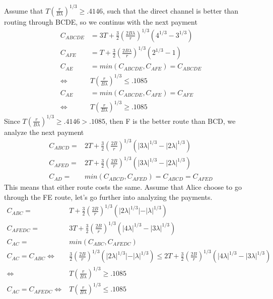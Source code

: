 \documentclass[12pt]{article}
\theoremstyle{plain}
\theoremstyle{remark}
\theoremstyle{definition}
\renewcommand{\geq}{\geqslant}
\renewcommand{\leq}{\leqslant}
\renewcommand{\geq}{\geqslant}
\renewcommand{\leq}{\leqslant}
\begin{document}
Assume that $T(\frac{r}{B\lambda})^{1/3} \geq .4146$, such that the direct channel is better than routing through BCDE, so we continus with the next payment
\begin{align}
  C_{ABCDE} &= 3T+ \frac{3}{2}(\frac{2B\lambda}{r})^{1/3}(4^{1/3}-3^{1/3})\\
  C_{AFE} &= T+ \frac{3}{2}(\frac{2B\lambda}{r})^{1/3}(2^{1/3}-1)\\
  C_{AE} &= min(C_{ABCDE},C_{AFE}) = C_{ABCDE} 
  \\ \iff & T (\frac{r}{B\lambda})^{1/3} \leq .1085\\
  C_{AE} &= min(C_{ABCDE},C_{AFE}) = C_{AFE} \\
  \iff & T (\frac{r}{B\lambda})^{1/3} \geq .1085
\end{align}
Since $T(\frac{r}{B\lambda})^{1/3} \geq .4146 > .1085$, then F is the better route than BCD, we analyze the next payment
\begin{align}
  C_{ABCD} = &2T+ \frac{3}{2}(\frac{2B}{r})^{1/3}(|3\lambda|^{1/3}-|2\lambda|^{1/3})\\
  C_{AFED} = &2T+ \frac{3}{2}(\frac{2B}{r})^{1/3}(|3\lambda|^{1/3}-|2\lambda|^{1/3})\\
  C_{AD} =& min(C_{ABCD},C_{AFED}) = C_{ABCD}=C_{AFED}
\end{align}
This means that either route costs the same. Assume that Alice choose to go through the FE route, let's go further into analyzing the payments.
\begin{align}
  C_{ABC} = &T+ \frac{3}{2}(\frac{2B}{r})^{1/3}(|2\lambda|^{1/3}|-|\lambda|^{1/3})\\
  C_{AFEDC} = &3T+ \frac{3}{2}(\frac{2B}{r})^{1/3}(|4\lambda|^{1/3}-|3\lambda|^{1/3})\\
  C_{AC} =& min(C_{ABC},C_{AFEDC})\\
  C_{AC} = C_{ABC} \iff & \frac{3}{2}(\frac{2B}{r})^{1/3}(|2\lambda|^{1/3}|-|\lambda|^{1/3}) \leq 2T+ \frac{3}{2}(\frac{2B}{r})^{1/3}(|4\lambda|^{1/3}-|3\lambda|^{1/3})\\
  \iff & T (\frac{r}{B\lambda})^{1/3} \geq .1085 \\
  C_{AC} = C_{AFEDC} \iff & T (\frac{r}{B\lambda})^{1/3} \leq .1085
\end{align}
\end{document}
